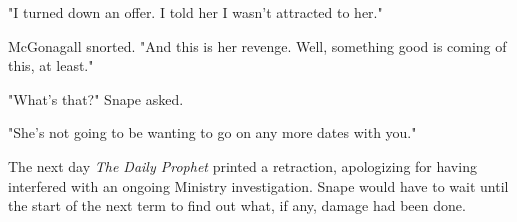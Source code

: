 "I turned down an offer. I told her I wasn't attracted to her."

McGonagall snorted. "And this is her revenge. Well, something good is coming of this, at least."

"What's that?" Snape asked.

"She's not going to be wanting to go on any more dates with you."

The next day \emph{The Daily Prophet} printed a retraction, apologizing for having interfered with an ongoing Ministry investigation. Snape would have to wait until the start of the next term to find out what, if any, damage had been done.


